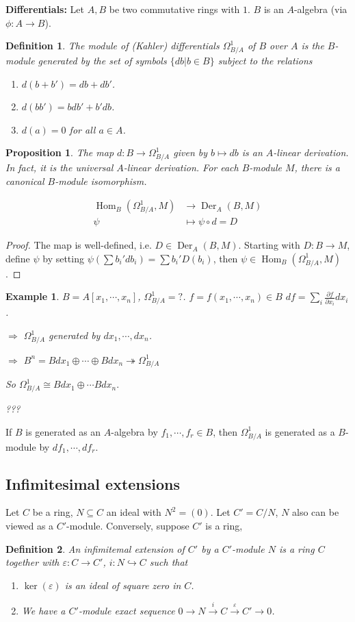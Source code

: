 \documentclass[cs4size]{article}
\newcommand{\su}{\subseteq}
\newcommand{\ra}{\rightarrow}
\newcommand{\xr}{\xrightarrow}
\newcommand{\Ra}{\Rightarrow}
\DeclareMathOperator{\Der}{Der}
\DeclareMathOperator{\Hom}{Hom}
\newtheorem{definition}{Definition}
\newtheorem{prop}{Proposition}
\newtheorem{ex}{Example}
\begin{document}
\textbf{Differentials:} Let $A,B$ be two commutative rings with $1$. $B$ is an $A$-algebra (via $\phi: A\ra B$).
\begin{definition}
The module of (Kahler) differentials $\Omega_{B/A}^1$ of $B$ over $A$ is the $B$-module generated by the set of symbols $\{db|b\in B\}$ subject to the relations
\begin{enumerate}
\item $d(b+b')=db+db'$.
\item $d(bb')=bdb'+b'db$.
\item $d(a)=0$ for all $a\in A$.
\end{enumerate}
\end{definition}
\begin{prop}
The map $d: B\ra \Omega_{B/A}^1$ given by $b\mapsto db$ is an $A$-linear derivation. In fact, it is the universal $A$-linear derivation. For each $B$-module $M$, there is a canonical $B$-module isomorphism.
\end{prop}
\begin{align*}
\Hom_B(\Omega_{B/A}^1,M)&\ra \Der_A(B,M)\\
\psi&\mapsto \psi\circ d=D
\end{align*}
\begin{proof}
The map is well-defined, i.e. $D\in\Der_A(B,M)$.
Starting with $D: B\ra M$, define $\psi$ by setting $\psi(\sum b_i'db_i)=\sum b_i'D(b_i)$, then $\psi\in \Hom_B(\Omega_{B/A}^1,M)$.
\end{proof}

\begin{ex}
$B=A[x_1,\cdots,x_n]$, $\Omega_{B/A}^1=?$. $f=f(x_1,\cdots,x_n)\in B$
$df=\sum_i\frac{\partial f}{\partial x_i}dx_i$.

$\Ra$ $\Omega_{B/A}^1$ generated by $dx_1,\cdots,dx_n$.

$\Ra$ $B^n=B dx_1\oplus\cdots\oplus Bdx_n\twoheadrightarrow \Omega_{B/A}^1$

So $\Omega_{B/A}^1\cong B dx_1\oplus\cdots B dx_n.$

???
\end{ex}

 If $B$ is generated as an $A$-algebra by $f_1,\cdots,f_r\in B$, then $\Omega_{B/A}^1$ is generated as a $B$-module by $df_1,\cdots,df_r$.

\subsection{Infimitesimal extensions}
Let $C$ be a ring, $N\su C$ an ideal with $N^2=(0)$. Let $C'=C/N$, $N$ also can be viewed as a $C'$-module. Conversely, suppose $C'$ is a ring,
\begin{definition}
An infimitemal extension of $C'$ by a $C'$-module $N$ is a ring $C$ together with $\varepsilon: C\ra C'$, $i: N\hookrightarrow C$ such that
\begin{enumerate}
\item $\ker(\varepsilon)$ is an ideal of square zero in $C$.
\item We have a $C'$-module exact sequence $0\ra N\xr{i}C\xr{\varepsilon}C'\ra0$.
\end{enumerate}
\end{definition}
\end{document}
